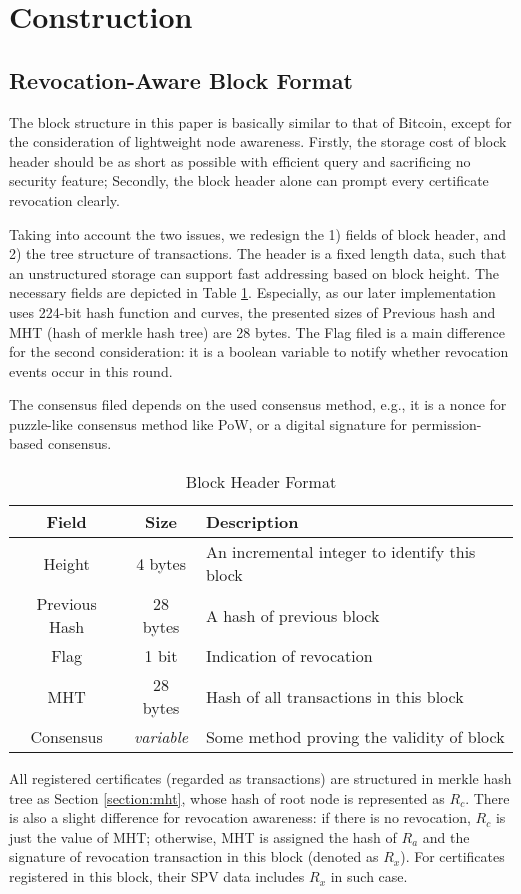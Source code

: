 \documentclass[conference]{IEEEtran}
\begin{document}
\section{Construction}
\subsection{Revocation-Aware Block Format}
The block structure in this paper is basically similar to that of Bitcoin, except for the consideration of lightweight node awareness. Firstly, the storage cost of block header should be as short as possible with efficient query and sacrificing no security feature; Secondly, the block header alone can prompt every certificate revocation clearly. 

Taking into account the two issues, we redesign the 1) fields of block header, and 2) the tree structure of transactions. The header is a fixed length data, such that an unstructured storage can support fast addressing based on block height. The necessary fields are depicted in Table \ref{table:format}. Especially, as our later implementation uses 224-bit hash function and curves, the presented sizes of Previous hash and MHT (hash of merkle hash tree) are 28 bytes. The Flag filed is a main difference for the second consideration: it is a boolean variable to notify whether revocation events occur in this round.

The consensus filed depends on the used consensus method, e.g., it is a nonce for puzzle-like consensus method like PoW, or a digital signature for permission-based consensus.


\begin{table}[h] 
	\caption{Block Header Format}\label{table:format}
	\centering
	\begin{tabular}{c|c|l}
		\hline
		Field & Size & Description \\
		\hline
		Height & 4 bytes & An incremental integer to identify this block \\
		Previous Hash & 28 bytes & A hash of previous block \\
		Flag & 1 bit & Indication of revocation \\
		MHT & 28 bytes & Hash of all transactions in this block \\
		Consensus & \textit{variable} & Some method proving the validity of block\\
		\hline
	\end{tabular}
\end{table}

All registered certificates (regarded as transactions) are structured in merkle hash tree as Section \ref{section:mht}, whose hash of root node is represented as $R_c$. There is also a slight difference for revocation awareness: if there is no revocation, $R_c$ is just the value of MHT; otherwise, MHT is assigned the hash of $R_a$ and the signature of revocation transaction in this block (denoted as $R_x$). For certificates registered in this block, their SPV data includes $R_x$ in such case.
\end{document}
